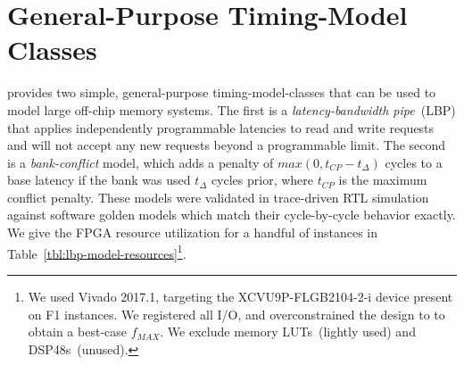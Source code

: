 
\vspace{-0.05in}
\section{General-Purpose Timing-Model Classes}\label{sec:timing_model}

\PNAME provides two simple, general-purpose timing-model-classes that can be used to
model large off-chip memory systems. The first is a \emph{latency-bandwidth
pipe}~(LBP) that applies independently programmable latencies to read and write
requests and will not accept any new requests beyond a programmable limit. The
second is a \emph{bank-conflict} model, which adds a penalty of $max(0, t_{CP} -
t_{\Delta})$ cycles to a base latency if the bank was used
$t_{\Delta}$ cycles prior, where $t_{CP}$ is the maximum conflict penalty.
These models were validated in trace-driven RTL simulation against
software golden models which match their cycle-by-cycle behavior exactly.  We
give the FPGA resource utilization for a handful of
instances in Table~\ref{tbl:lbp-model-resources}\footnote{We
used Vivado 2017.1, targeting the XCVU9P-FLGB2104-2-i device present on F1
instances. We registered all I/O, and overconstrained the design
to  to obtain a best-case $f_{MAX}$. We exclude memory
LUTs~(lightly used) and DSP48s~(unused).}.

